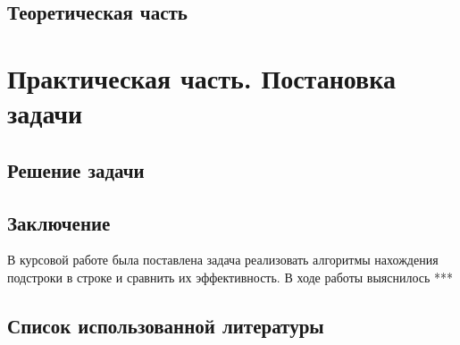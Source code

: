 

% 
% 

\begin{center}
    \tableofcontents
\end{center}

\newpage

\begin{center}
    \section{Теоретическая часть}
\end{center}

\newpage

\section{Практическая часть. Постановка задачи}

\newpage

\begin{center}
    \section{Решение задачи}
\end{center}

\newpage

\begin{center}
    \section{Заключение}
\end{center}

В курсовой работе была поставлена задача реализовать алгоритмы нахождения подстроки в строке и сравнить их эффективность. В ходе работы выяснилось ***

\newpage

\begin{center}
    \section{Список использованной литературы}
    \renewcommand{\refname}{}
    
\end{center}


